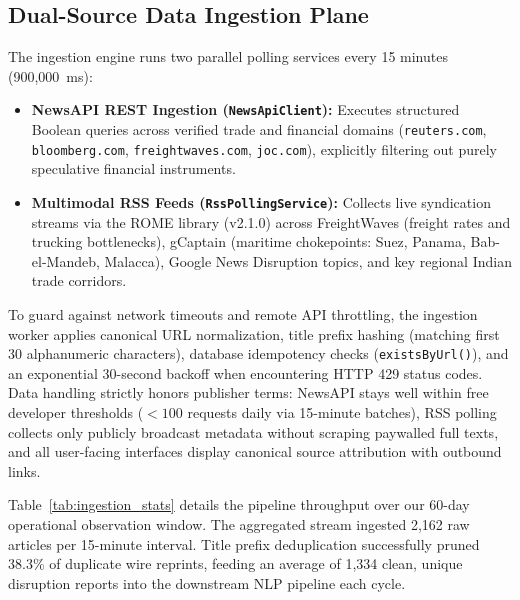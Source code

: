 \documentclass[conference]{IEEEtran}
\begin{document}
\subsection{Dual-Source Data Ingestion Plane}
The ingestion engine runs two parallel polling services every 15 minutes (900,000~ms):
\begin{itemize}
    \item \textbf{NewsAPI REST Ingestion (\texttt{NewsApiClient}):} Executes structured Boolean queries across verified trade and financial domains (\texttt{reuters.com}, \texttt{bloomberg.com}, \texttt{freightwaves.com}, \texttt{joc.com}), explicitly filtering out purely speculative financial instruments.
    \item \textbf{Multimodal RSS Feeds (\texttt{RssPollingService}):} Collects live syndication streams via the ROME library (v2.1.0) across FreightWaves (freight rates and trucking bottlenecks), gCaptain (maritime chokepoints: Suez, Panama, Bab-el-Mandeb, Malacca), Google News Disruption topics, and key regional Indian trade corridors.
\end{itemize}

To guard against network timeouts and remote API throttling, the ingestion worker applies canonical URL normalization, title prefix hashing (matching first 30 alphanumeric characters), database idempotency checks (\texttt{existsByUrl()}), and an exponential 30-second backoff when encountering HTTP 429 status codes. Data handling strictly honors publisher terms: NewsAPI stays well within free developer thresholds ($<100$ requests daily via 15-minute batches), RSS polling collects only publicly broadcast metadata without scraping paywalled full texts, and all user-facing interfaces display canonical source attribution with outbound links.

Table~\ref{tab:ingestion_stats} details the pipeline throughput over our 60-day operational observation window. The aggregated stream ingested 2,162 raw articles per 15-minute interval. Title prefix deduplication successfully pruned 38.3\% of duplicate wire reprints, feeding an average of 1,334 clean, unique disruption reports into the downstream NLP pipeline each cycle.
\end{document}
